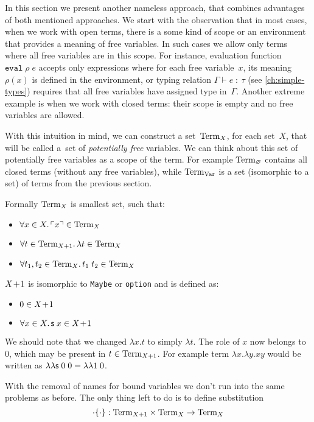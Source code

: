 In this section we present another nameless approach,
that combines advantages of both mentioned approaches.
We start with the observation that in most cases, when we work
with open terms, there is a some kind of scope or an environment
that provides a meaning of free variables.
In such cases we allow only terms where all free variables
are in this scope.
For instance, evaluation function $\texttt{eval}\;\rho\;e$
accepts only expressions where for each free variable~$x$,
its meaning $\rho(x)$ is defined in the environment,
or typing relation $\Gamma\vdash e\;:\:\tau$
(see \autoref{ch:simple-types})
requires that all free variables have assigned type in~$\Gamma$.
Another extreme example is when we work with closed terms:
their scope is empty and no free variables are allowed.

With this intuition in mind, we can construct a set~$\mathrm{Term}_{X}$,
for each set~$X$, that will be called a~set of
\emph{potentially free} variables.
We can think about this set of potentially free variables
as a scope of the term.
For example $\mathrm{Term}_{\varnothing}$ contains all closed terms
(without any free variables),
while $\mathrm{Term}_{\mathrm{Var}}$ is a set (isomorphic to a set)
of terms from the previous section.

Formally $\mathrm{Term}_{X}$ is smallest set, such that:

\begin{itemize}
\item $\forall x \in X\ldotp \ulcorner x \urcorner \in \mathrm{Term}_{X}$
\item $\forall t \in \mathrm{Term}_{X+1}\ldotp \lambda t \in \mathrm{Term}_{X}$
\item $\forall t_1, t_2 \in \mathrm{Term}_{X}\ldotp t_1\;t_2 \in \mathrm{Term}_{X}$
\end{itemize}

$X\!+\!1$ is isomorphic to \texttt{Maybe} or \texttt{option}
and is defined as:

\begin{itemize}
\item $0 \in X\!+\!1$
\item $\forall x \in X\ldotp \mathsf{s}\;x \in X\!+\!1$
\end{itemize}

We should note that we changed $\lambda x.t$ to simply $\lambda t$.
The role of $x$ now belongs to 0, which may be present in $t \in \mathrm{Term}_{X+1}$.
For example term $\lambda x.\lambda y. xy$
would be written as $\lambda\lambda \mathsf{s}\;0\;0 = \lambda\lambda 1\;0$.

With the removal of names for bound variables we don't run into the same problems as before.
The only thing left to do is to define substitution
\[
	\cdot\{\cdot\}:
  \mathrm{Term}_{X+1} \times \mathrm{Term}_{X} \to \mathrm{Term}_{X}
\]

